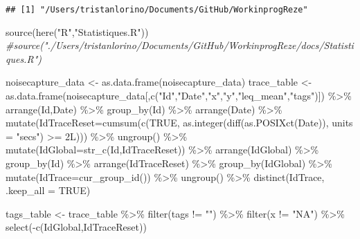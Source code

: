 \documentclass[
]{book}
\newenvironment{Shaded}{\begin{snugshade}}{\end{snugshade}}
\newcommand{\AttributeTok}[1]{\textcolor[rgb]{0.77,0.63,0.00}{#1}}
\newcommand{\CommentTok}[1]{\textcolor[rgb]{0.56,0.35,0.01}{\textit{#1}}}
\newcommand{\ConstantTok}[1]{\textcolor[rgb]{0.00,0.00,0.00}{#1}}
\newcommand{\FunctionTok}[1]{\textcolor[rgb]{0.00,0.00,0.00}{#1}}
\newcommand{\NormalTok}[1]{#1}
\newcommand{\OtherTok}[1]{\textcolor[rgb]{0.56,0.35,0.01}{#1}}
\newcommand{\SpecialCharTok}[1]{\textcolor[rgb]{0.00,0.00,0.00}{#1}}
\newcommand{\StringTok}[1]{\textcolor[rgb]{0.31,0.60,0.02}{#1}}
\begin{document}
\begin{verbatim}
## [1] "/Users/tristanlorino/Documents/GitHub/WorkinprogReze"
\end{verbatim}

\begin{Shaded}
\begin{Highlighting}[]
\FunctionTok{source}\NormalTok{(}\FunctionTok{here}\NormalTok{(}\StringTok{"R"}\NormalTok{,}\StringTok{"Statistiques.R"}\NormalTok{))}
\CommentTok{\#source("./Users/tristanlorino/Documents/GitHub/WorkinprogReze/docs/Statistiques.R")}

\NormalTok{noisecapture\_data }\OtherTok{\textless{}{-}} \FunctionTok{as.data.frame}\NormalTok{(noisecapture\_data)}
\NormalTok{trace\_table }\OtherTok{\textless{}{-}} \FunctionTok{as.data.frame}\NormalTok{(noisecapture\_data[,}\FunctionTok{c}\NormalTok{(}\StringTok{"Id"}\NormalTok{,}\StringTok{"Date"}\NormalTok{,}\StringTok{"x"}\NormalTok{,}\StringTok{"y"}\NormalTok{,}\StringTok{"leq\_mean"}\NormalTok{,}\StringTok{"tags"}\NormalTok{)]) }\SpecialCharTok{\%\textgreater{}\%}
  \FunctionTok{arrange}\NormalTok{(Id,Date) }\SpecialCharTok{\%\textgreater{}\%}
  \FunctionTok{group\_by}\NormalTok{(Id) }\SpecialCharTok{\%\textgreater{}\%}
  \FunctionTok{arrange}\NormalTok{(Date) }\SpecialCharTok{\%\textgreater{}\%}
  \FunctionTok{mutate}\NormalTok{(}\AttributeTok{IdTraceReset=}\FunctionTok{cumsum}\NormalTok{(}\FunctionTok{c}\NormalTok{(}\ConstantTok{TRUE}\NormalTok{, }\FunctionTok{as.integer}\NormalTok{(}\FunctionTok{diff}\NormalTok{(}\FunctionTok{as.POSIXct}\NormalTok{(Date)), }\AttributeTok{units =} \StringTok{"secs"}\NormalTok{) }\SpecialCharTok{\textgreater{}=}\NormalTok{ 2L))) }\SpecialCharTok{\%\textgreater{}\%}
  \FunctionTok{ungroup}\NormalTok{() }\SpecialCharTok{\%\textgreater{}\%}
  \FunctionTok{mutate}\NormalTok{(}\AttributeTok{IdGlobal=}\FunctionTok{str\_c}\NormalTok{(Id,IdTraceReset)) }\SpecialCharTok{\%\textgreater{}\%}
  \FunctionTok{arrange}\NormalTok{(IdGlobal) }\SpecialCharTok{\%\textgreater{}\%}
  \FunctionTok{group\_by}\NormalTok{(Id) }\SpecialCharTok{\%\textgreater{}\%}
  \FunctionTok{arrange}\NormalTok{(IdTraceReset) }\SpecialCharTok{\%\textgreater{}\%}
  \FunctionTok{group\_by}\NormalTok{(IdGlobal) }\SpecialCharTok{\%\textgreater{}\%}
  \FunctionTok{mutate}\NormalTok{(}\AttributeTok{IdTrace=}\FunctionTok{cur\_group\_id}\NormalTok{()) }\SpecialCharTok{\%\textgreater{}\%}
  \FunctionTok{ungroup}\NormalTok{() }\SpecialCharTok{\%\textgreater{}\%}
  \FunctionTok{distinct}\NormalTok{(IdTrace, }\AttributeTok{.keep\_all =} \ConstantTok{TRUE}\NormalTok{)}

\NormalTok{tags\_table }\OtherTok{\textless{}{-}}\NormalTok{ trace\_table }\SpecialCharTok{\%\textgreater{}\%}
  \FunctionTok{filter}\NormalTok{(tags }\SpecialCharTok{!=} \StringTok{""}\NormalTok{) }\SpecialCharTok{\%\textgreater{}\%}
  \FunctionTok{filter}\NormalTok{(x }\SpecialCharTok{!=} \StringTok{"NA"}\NormalTok{) }\SpecialCharTok{\%\textgreater{}\%}
  \FunctionTok{select}\NormalTok{(}\SpecialCharTok{{-}}\FunctionTok{c}\NormalTok{(IdGlobal,IdTraceReset))}
\end{Highlighting}
\end{Shaded}
\end{document}
